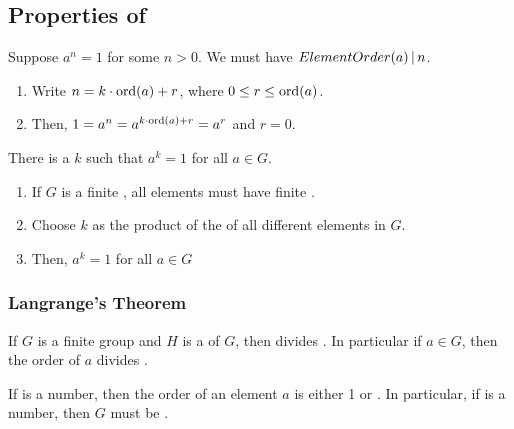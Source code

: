 \subsection{Properties of }\label{subsec:Properties_of_Groups}
\begin{propertylist}
\item Suppose $a^{n} = 1$ for some $n > 0$. We must have $ElementOrder(a) \operatorname{\vert} n$.
  \begin{enumerate}[noitemsep]
  \item Write $n = k \cdot \operatorname{\text{ord}}(a) + r$, where $0 \leq r \leq \operatorname{\text{ord}}(a)$.
  \item Then, $1 = a^{n} = a^{k \cdot \operatorname{\text{ord}}(a) + r} = a^{r}$ and $r = 0$.
  \end{enumerate}
\item There is a $k$ such that $a^{k} = 1$ for all $a \in G$.
  \begin{enumerate}[noitemsep]
  \item If $G$ is a finite , all elements must have finite .
  \item Choose $k$ as the product of the  of all different elements in $G$.
  \item Then, $a^{k} = 1$ for all $a \in G$
  \end{enumerate}
\end{propertylist}

\subsubsection{Langrange's Theorem}\label{subsubsec:Langranges_Theorem}
\begin{theorem}
  If $G$ is a finite group and $H$ is a  of $G$, then  divides .
  In particular if $a \in G$, then the order of $a$ divides .
\end{theorem}

\begin{remark*}
  If  is a  number, then the order of an element $a$ is either 1 or .
  In particular, if  is a  number, then $G$ must be .
\end{remark*}

